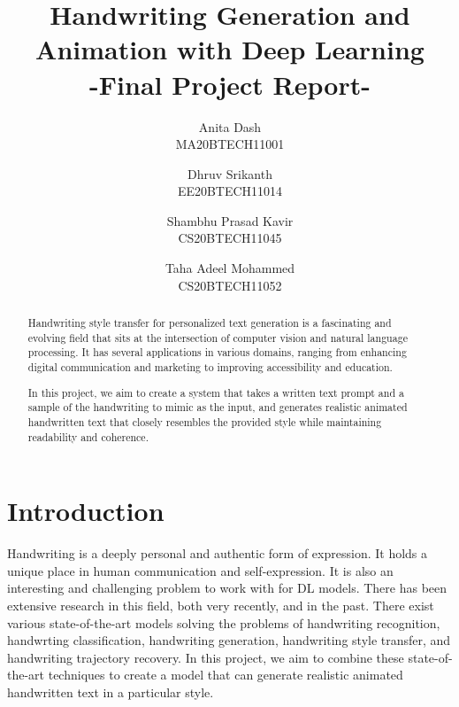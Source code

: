 \documentclass[10pt,twocolumn,letterpaper]{article}
\begin{document}
\title{Handwriting Generation and Animation with Deep Learning\\-Final Project Report-}

\author{Anita Dash\\
MA20BTECH11001\\
\and
Dhruv Srikanth\\
EE20BTECH11014\\
\and
Shambhu Prasad Kavir\\
CS20BTECH11045\\
\and
Taha Adeel Mohammed\\
CS20BTECH11052\\
}

\maketitle

\begin{abstract}
   Handwriting style transfer for personalized text generation is a fascinating and evolving field that sits at the intersection of computer vision and natural language processing. It has several applications in various domains, ranging from enhancing digital communication and marketing to improving accessibility and education.

   In this project, we aim to create a system that takes a written text prompt and a sample of the handwriting to mimic as the input, and generates realistic animated handwritten text that closely resembles the provided style while maintaining readability and coherence.
\end{abstract}

\section{Introduction}
\label{sec:introduction}
Handwriting is a deeply personal and authentic form of expression. It holds a unique place in human communication and self-expression. It is also an interesting and challenging problem to work with for DL models. There has been extensive research in this field, both very recently, and in the past. There exist various state-of-the-art models solving the problems of handwriting recognition, handwrting classification, handwriting generation, handwriting style transfer, and handwriting trajectory recovery. In this project, we aim to combine these state-of-the-art techniques to create a model that can generate realistic animated handwritten text in a particular style.
\end{document}
